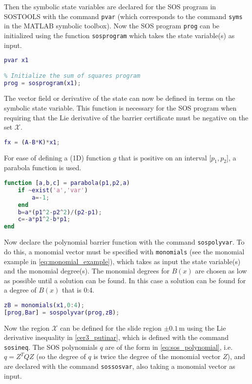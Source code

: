 Then the symbolic state variables are declared for the SOS program in SOSTOOLS with the command \texttt{pvar} (which corresponds to the command \texttt{syms} in the MATLAB symbolic toolbox). Now the SOS program \texttt{prog} can be initialized using the function \texttt{sosprogram} which takes the state variable(s) as input. 
\begin{lstlisting}[language=matlab]
% Declare state variables
pvar x1

% Initialize the sum of squares program
prog = sosprogram(x1);
\end{lstlisting}
The vector field or derivative of the state can now be defined in terms on the symbolic state variable. This function is necessary for the SOS program when requiring that the Lie derivative of the barrier certificate must be negative on the set $\mathcal{X}$.
\begin{lstlisting}[language=matlab]
% Vector field dx/dt = fx (closed loop)
fx = (A-B*K)*x1;
\end{lstlisting}
For ease of defining a (1D) function $g$ that is positive on an interval [$p_1, p_2$], a parabola function is used.
\begin{lstlisting}[language=matlab]
function [a,b,c] = parabola(p1,p2,a)
	if ~exist('a','var')
		a=-1;
	end
	b=a*(p1^2-p2^2)/(p2-p1);
	c=-a*p1^2-b*p1;
end
\end{lstlisting}
Now declare the polynomial barrier function with the command \texttt{sospolyvar}. To do this, a monomial vector must be specified with \texttt{monomials} (see the monomial example in \autoref{eq:monomial_example}), which takes as input the state variable(s) and the monomial degree(s). The monomial degrees for $B(x)$ are chosen as low as possible until a solution can be found. In this case a solution can be found for a degree of $B(x)$ that is 0:4.
\begin{lstlisting}[language=matlab]
% Declare the polynomial barrier function
zB = monomials(x1,0:4);
[prog,Bar] = sospolyvar(prog,zB);
\end{lstlisting}
Now the region $\mathcal{X}$ can be defined for the slide region $\pm0.1$\,m using the Lie derivative inequality in \autoref{cer3_putinar}, which is defined with the command \texttt{sosineq}. The SOS polynomials $q$ are of the form in \autoref{eq:sos_polynomial}, i.e. $q=Z^TQZ$ (so the degree of $q$ is twice the degree of the monomial vector $Z$), and are declared with the command \texttt{sossosvar}, also taking a monomial vector as input.
